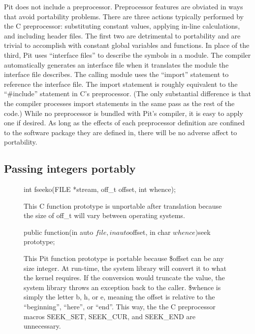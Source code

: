 Pit does not include a preprocessor.  Preprocessor features are obviated in ways that avoid portability problems.
There are three actions typically performed by the C preprocessor:  substituting constant values, applying in-line
calculations, and including header files.  The first two are detrimental to portability and are trivial to accomplish
with constant global variables and functions.  In place of the third, Pit uses ``interface files'' to describe the
symbols in a module.  The compiler automatically generates an interface file when it translates the module the
interface file describes.  The calling module uses the ``import'' statement to reference the interface file.  The
import statement is roughly equivalent to the ``\#include'' statement in C's preprocessor.  (The only substantial
difference is that the compiler processes import statements in the same pass as the rest of the code.)  While no
preprocessor is bundled with Pit's compiler, it is easy to apply one if desired.  As long as the effects of each
preprocessor definition are confined to the software package they are defined in, there will be no adverse affect to
portability.

\subsection{Passing integers portably}

\begin{figure}[htb]
	\begin{sourcestyle}
		\begin{verbatimtab}[\sourcetabsize]
int fseeko(FILE *stream, off_t offset, int whence);\end{verbatimtab}
	\end{sourcestyle}
	\caption{This C function prototype is unportable after translation because the size of off\_t will vary between operating systems.}
	\label{example_portability_proto.c}
\end{figure}

\begin{figure}[htb]
	\begin{sourcestyle}
		\begin{verbatimtab}[\sourcetabsize]
public function(in auto $file, in auto $offset,
	in char $whence) $seek prototype;\end{verbatimtab}
	\end{sourcestyle}
	\caption{This Pit function prototype is portable because \$offset can be any size integer.  At run-time, the
		system library will convert it to what the kernel requires.  If the conversion would truncate the
		value, the system library throws an exception back to the caller.  \$whence is simply the letter b,
		h, or e, meaning the offset is relative to the ``beginning'', ``here'', or ``end''.  This way, the
		the C preprocessor macros SEEK\_SET, SEEK\_CUR, and SEEK\_END are unnecessary.}
	\label{example_portability_proto.p}
\end{figure}

